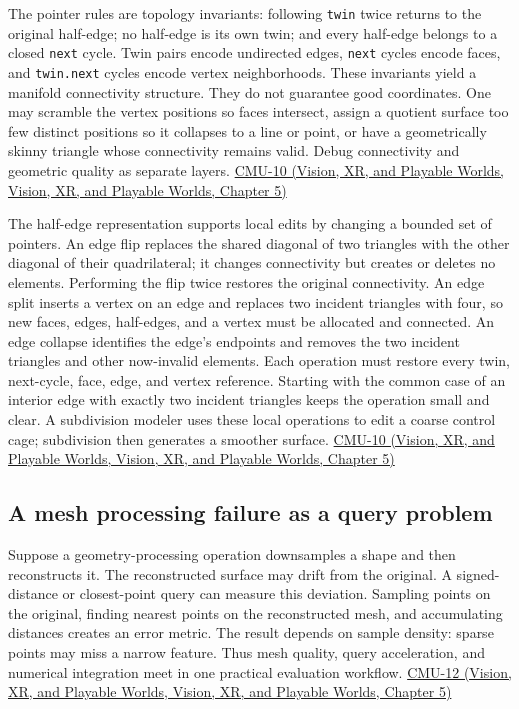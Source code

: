 The pointer rules are topology invariants: following \texttt{twin} twice returns to the original half-edge; no half-edge is its own twin; and every half-edge belongs to a closed \texttt{next} cycle. Twin pairs encode undirected edges, \texttt{next} cycles encode faces, and \texttt{twin.next} cycles encode vertex neighborhoods. These invariants yield a manifold connectivity structure. They do not guarantee good coordinates. One may scramble the vertex positions so faces intersect, assign a quotient surface too few distinct positions so it collapses to a line or point, or have a geometrically skinny triangle whose connectivity remains valid. Debug connectivity and geometric quality as separate layers. \href{../07-Vision-XR-and-Playable-Worlds/main.pdf\#nameddest=04-visual-computing-ii-ch036-cmu-10---meshes-and-manifolds}{CMU-10 (Vision, XR, and Playable Worlds, Vision, XR, and Playable Worlds, Chapter 5)}

The half-edge representation supports local edits by changing a bounded set of pointers. An edge flip replaces the shared diagonal of two triangles with the other diagonal of their quadrilateral; it changes connectivity but creates or deletes no elements. Performing the flip twice restores the original connectivity. An edge split inserts a vertex on an edge and replaces two incident triangles with four, so new faces, edges, half-edges, and a vertex must be allocated and connected. An edge collapse identifies the edge's endpoints and removes the two incident triangles and other now-invalid elements. Each operation must restore every twin, next-cycle, face, edge, and vertex reference. Starting with the common case of an interior edge with exactly two incident triangles keeps the operation small and clear. A subdivision modeler uses these local operations to edit a coarse control cage; subdivision then generates a smoother surface. \href{../07-Vision-XR-and-Playable-Worlds/main.pdf\#nameddest=04-visual-computing-ii-ch036-cmu-10---meshes-and-manifolds}{CMU-10 (Vision, XR, and Playable Worlds, Vision, XR, and Playable Worlds, Chapter 5)}

\subsection{A mesh processing failure as a query problem}\label{03-visual-computing-i-ch002-a-mesh-processing-failure-as-a-query-problem}

Suppose a geometry-processing operation downsamples a shape and then reconstructs it. The reconstructed surface may drift from the original. A signed-distance or closest-point query can measure this deviation. Sampling points on the original, finding nearest points on the reconstructed mesh, and accumulating distances creates an error metric. The result depends on sample density: sparse points may miss a narrow feature. Thus mesh quality, query acceleration, and numerical integration meet in one practical evaluation workflow. \href{../07-Vision-XR-and-Playable-Worlds/main.pdf\#nameddest=04-visual-computing-ii-ch036-cmu-12---geometric-queries}{CMU-12 (Vision, XR, and Playable Worlds, Vision, XR, and Playable Worlds, Chapter 5)}

